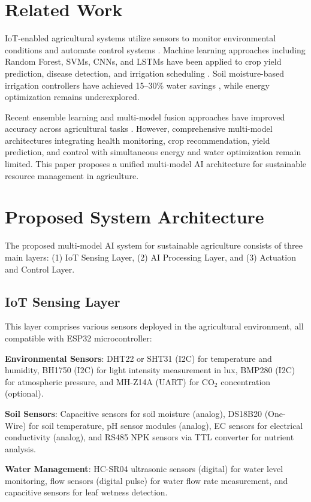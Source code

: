 \documentclass[conference]{IEEEtran}
\begin{document}
\section{Related Work}

IoT-enabled agricultural systems utilize sensors to monitor environmental conditions and automate control systems \cite{b1}. Machine learning approaches including Random Forest, SVMs, CNNs, and LSTMs have been applied to crop yield prediction, disease detection, and irrigation scheduling \cite{b2,b3}. Soil moisture-based irrigation controllers have achieved 15--30\% water savings \cite{b5}, while energy optimization remains underexplored.

Recent ensemble learning and multi-model fusion approaches have improved accuracy across agricultural tasks \cite{b7,b8}. However, comprehensive multi-model architectures integrating health monitoring, crop recommendation, yield prediction, and control with simultaneous energy and water optimization remain limited. This paper proposes a unified multi-model AI architecture for sustainable resource management in agriculture.

\section{Proposed System Architecture}

The proposed multi-model AI system for sustainable agriculture consists of three main layers: (1) IoT Sensing Layer, (2) AI Processing Layer, and (3) Actuation and Control Layer.

\subsection{IoT Sensing Layer}

This layer comprises various sensors deployed in the agricultural environment, all compatible with ESP32 microcontroller:

\textbf{Environmental Sensors}: DHT22 or SHT31 (I2C) for temperature and humidity, BH1750 (I2C) for light intensity measurement in lux, BMP280 (I2C) for atmospheric pressure, and MH-Z14A (UART) for CO$_2$ concentration (optional).

\textbf{Soil Sensors}: Capacitive sensors for soil moisture (analog), DS18B20 (One-Wire) for soil temperature, pH sensor modules (analog), EC sensors for electrical conductivity (analog), and RS485 NPK sensors via TTL converter for nutrient analysis.

\textbf{Water Management}: HC-SR04 ultrasonic sensors (digital) for water level monitoring, flow sensors (digital pulse) for water flow rate measurement, and capacitive sensors for leaf wetness detection.
\end{document}
